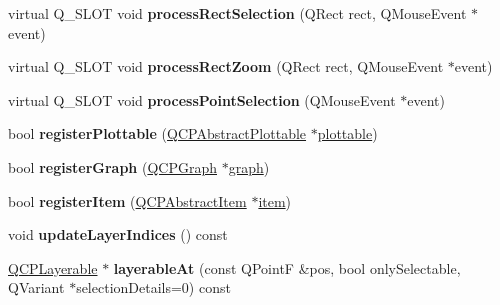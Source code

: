 \begin{DoxyCompactItemize}
\item 
virtual Q\+\_\+\+S\+L\+OT void {\bfseries process\+Rect\+Selection} (Q\+Rect rect, Q\+Mouse\+Event $\ast$event)\hypertarget{class_q_custom_plot_a5d9b02d0fa28820fe1f2f34587c3309a}{}\label{class_q_custom_plot_a5d9b02d0fa28820fe1f2f34587c3309a}

\item 
virtual Q\+\_\+\+S\+L\+OT void {\bfseries process\+Rect\+Zoom} (Q\+Rect rect, Q\+Mouse\+Event $\ast$event)\hypertarget{class_q_custom_plot_a66ab7c0b04ef3d44fe60818efb823c32}{}\label{class_q_custom_plot_a66ab7c0b04ef3d44fe60818efb823c32}

\item 
virtual Q\+\_\+\+S\+L\+OT void {\bfseries process\+Point\+Selection} (Q\+Mouse\+Event $\ast$event)\hypertarget{class_q_custom_plot_acbc612f6be151dd52a3f07df38455f9f}{}\label{class_q_custom_plot_acbc612f6be151dd52a3f07df38455f9f}

\item 
bool {\bfseries register\+Plottable} (\hyperlink{class_q_c_p_abstract_plottable}{Q\+C\+P\+Abstract\+Plottable} $\ast$\hyperlink{class_q_custom_plot_a32de81ff53e263e785b83b52ecd99d6f}{plottable})\hypertarget{class_q_custom_plot_aeba7733bb9fadfb5a375b3f40de9e58a}{}\label{class_q_custom_plot_aeba7733bb9fadfb5a375b3f40de9e58a}

\item 
bool {\bfseries register\+Graph} (\hyperlink{class_q_c_p_graph}{Q\+C\+P\+Graph} $\ast$\hyperlink{class_q_custom_plot_a6d3ed93c2bf46ab7fa670d66be4cddaf}{graph})\hypertarget{class_q_custom_plot_acfc01230bddaea4f1782e4aa7d130af6}{}\label{class_q_custom_plot_acfc01230bddaea4f1782e4aa7d130af6}

\item 
bool {\bfseries register\+Item} (\hyperlink{class_q_c_p_abstract_item}{Q\+C\+P\+Abstract\+Item} $\ast$\hyperlink{class_q_custom_plot_a3e842b5a65b1d17fbb96cfb1fa1314d1}{item})\hypertarget{class_q_custom_plot_afbd4010b2e3f364c8d512691b2a1640a}{}\label{class_q_custom_plot_afbd4010b2e3f364c8d512691b2a1640a}

\item 
void {\bfseries update\+Layer\+Indices} () const \hypertarget{class_q_custom_plot_a3117754df3a5638787a6223c7147970f}{}\label{class_q_custom_plot_a3117754df3a5638787a6223c7147970f}

\item 
\hyperlink{class_q_c_p_layerable}{Q\+C\+P\+Layerable} $\ast$ {\bfseries layerable\+At} (const Q\+PointF \&pos, bool only\+Selectable, Q\+Variant $\ast$selection\+Details=0) const \hypertarget{class_q_custom_plot_a5df850030771335824181103608961bf}{}\label{class_q_custom_plot_a5df850030771335824181103608961bf}


\end{DoxyCompactItemize}
